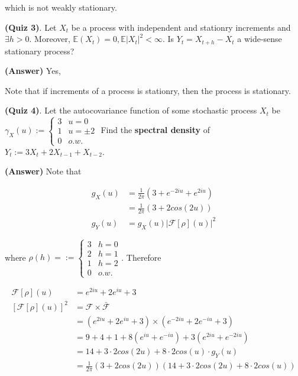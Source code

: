 \documentclass[12pt]{article}
\theoremstyle{nonumberbreak}
\begin{document}
which is not weakly stationary. 


\textbf{(Quiz 3)}. Let $X_t$ be a process with independent and stationry increments and $\exists h>0$. Moreover, $\mathbb{E}(X_t) = 0, \mathbb{E}|X_t|^2 < \infty$. Is $Y_t = X_{t+h} - X_t$ a wide-sense stationary process? 

\textbf{(Answer)} Yes,

Note that if increments of a process is stationry, then the process is stationary.



\textbf{(Quiz 4)}. Let the autocovariance function of some stochastic process $X_t$ be $\gamma_X(u) := \begin{cases} 3 & u=0 \\ 1 & u=\pm2 \\ 0 & o.w. \end{cases}$ Find the \textbf{spectral density} of $Y_t := 3X_t + 2X_{t-1} + X_{t-2}$. 

\textbf{(Answer)} Note that 

$$
\begin{aligned}
g_X(u) &= \frac{1}{2\pi} ( 3 + e^{-2iu} + e^{2iu}) \\[8pt]
&= \frac{1}{2\pi} (3 + 2 cos(2u)) \\[10pt]
g_Y(u) &= g_X(u) |\mathcal{F}[\rho] (u)|^2
\end{aligned}
$$

where $\rho(h) = := \begin{cases} 3 & h=0 \\ 2 & h=1 \\ 1 & h=2 \\ 0 & o.w. \end{cases}$. Therefore

$$
\begin{aligned}
\mathcal{F}[\rho] (u) &= e^{2iu} + 2e^{iu} + 3 \\[8pt]
[\mathcal{F}[\rho] (u)]^2 &= \mathcal{F} \times \bar{\mathcal{F}} \\[8pt]
&= (e^{2iu} + 2e^{iu} + 3) \times (e^{-2iu} + 2e^{-iu} + 3) \\[8pt]
&= 9 + 4 + 1 + 8(e^{iu} + e^{-iu}) + 3(e^{2iu} + e^{-2iu}) \\[8pt]
&= 14 + 3\cdot 2cos(2u) + 8\cdot 2 cos(u) \cdot g_Y(u) \\[8pt]
&= \frac{1}{2\pi} (3 + 2cos(2u)) (14 + 3 \cdot 2cos(2u) + 8\cdot 2 cos(u)) \\[8pt]
\end{aligned}
$$
\end{document}
